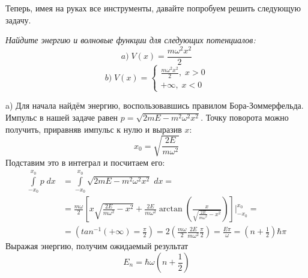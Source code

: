 Теперь, имея на руках все инструменты, давайте попробуем решить следующую задачу.
\newpage
{}
\begin{center}
    \textit{Найдите энергию и волновые функции для следующих потенциалов:}
    \[
    a)\;V(x) = \frac{m\omega^2 x^2}{2}
    \]
    \[
    b)\;V(x) = 
    \begin{cases}
     \frac{m\omega^2 x^2}{2},\;x > 0\\
    +\infty,\; x < 0
    \end{cases}
    \]
\end{center}

a) Для начала найдём энергию, воспользовавшись правилом Бора-Зоммерфельда. Импульс в нашей задаче равен $p = \sqrt{2mE - m^2\omega^2x^2}$. Точку поворота можно получить, приравняв импульс к нулю и выразив $x$:
\[
x_0 = \sqrt{\frac{2E}{m\omega^2}}
\]
Подставим это в интеграл и посчитаем его:
\begin{align*}
\int\limits_{-x_0}^{x_0}p\;dx & = \int\limits_{-x_0}^{x_0}\sqrt{2mE - m^2\omega^2x^2}\;dx =\\& = \frac{m\omega}{2}\left[x\sqrt{\frac{2E}{m\omega^2}- x^2} + \frac{2E}{m\omega^2}\arctan\left( \frac{x}{\sqrt{\frac{2E}{m\omega^2} - x^2}} \right)\right]\Bigg|_{-x_0}^{x_0} = \\ & = \left( tan^{-1}(+\infty) = \frac{\pi}{2}\right) = 2(\frac{m\omega}{2}\frac{2E}{m\omega^2}\frac{\pi}{2}) = \frac{E\pi}{\omega} = (n + \frac{1}{2})\hbar\pi
\end{align*}
Выражая энергию, получим ожидаемый результат
\[
E_n = \hbar\omega(n + \frac{1}{2})
\]

